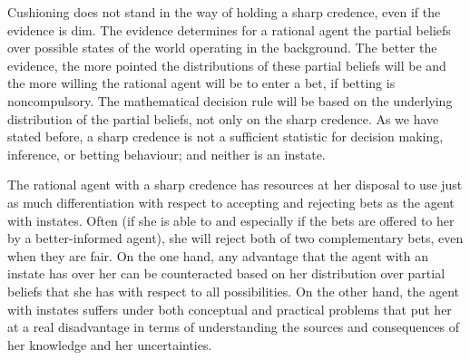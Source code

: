 \documentclass[11pt]{article}
\begin{document}
Cushioning does not stand in the way of holding a sharp credence, even
if the evidence is dim. The evidence determines for a rational agent
the partial beliefs over possible states of the world operating in the
background. The better the evidence, the more pointed the
distributions of these partial beliefs will be and the more willing
the rational agent will be to enter a bet, if betting is
noncompulsory. The mathematical decision rule will be based on the
underlying distribution of the partial beliefs, not only on the sharp
credence. As we have stated before, a sharp credence is not a
sufficient statistic for decision making, inference, or betting
behaviour; and neither is an instate.

The rational agent with a sharp credence has resources at her disposal
to use just as much differentiation with respect to accepting and
rejecting bets as the agent with instates. Often (if she is able to
and especially if the bets are offered to her by a better-informed
agent), she will reject both of two complementary bets, even when they
are fair. On the one hand, any advantage that the agent with an
instate has over her can be counteracted based on her distribution
over partial beliefs that she has with respect to all possibilities.
On the other hand, the agent with instates suffers under both
conceptual and practical problems that put her at a real disadvantage
in terms of understanding the sources and consequences of her
knowledge and her uncertainties.

 

\end{document}
